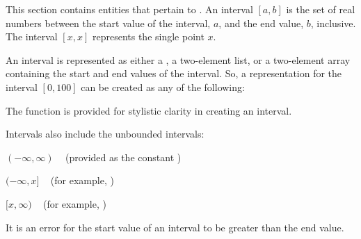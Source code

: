 \documentclass[10pt,twoside,english,pdftex]{article}
\begin{document}
This section contains  entities that pertain to
. An interval $[a,b]$ is the set of real numbers between the
start value of the interval, $a$, and the end value, $b$, inclusive. The
interval $[x,x]$ represents the single point $x$.

An interval is represented as either a , a two-element list, or a
two-element array containing the start and end values of the interval.  So, a
representation for the interval $[0,100]$ can be created as any of the
following:
\begin{tightitemize}
\item {}
\item {}
\item {}
\end{tightitemize}
%
The function  is provided for stylistic
clarity in creating an interval.

%
%
Intervals also include the unbounded intervals:
\begin{tightitemize}
\item $(-\infty,\infty)$ ~ (provided as the constant 
  )
\item $(-\infty,x]$      ~ (for example, 
   )
\item $[x,\infty)$       ~ (for example, 
   )
\end{tightitemize}

It is an error for the start value of an interval to be greater than the end
value.

\W\entities
\T\clearpage

\end{document}

